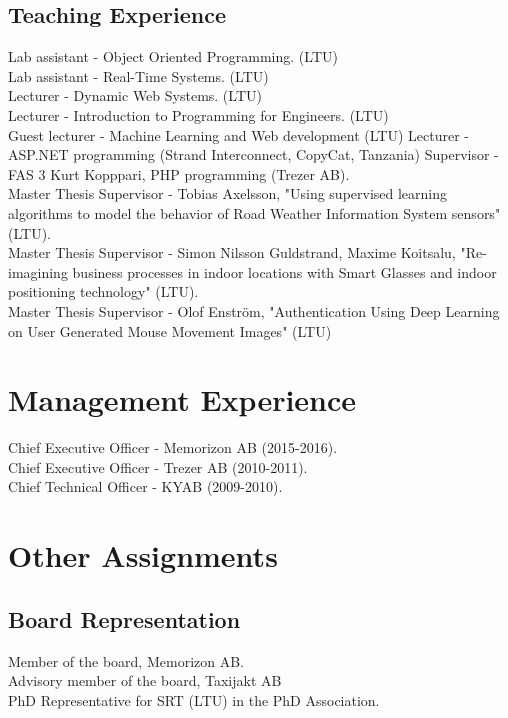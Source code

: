 \documentclass{article}
\begin{document}
\subsection{Teaching Experience}
Lab assistant - Object Oriented Programming. (LTU) \\
Lab assistant - Real-Time Systems. (LTU) \\
\newline
Lecturer - Dynamic Web Systems. (LTU) \\
Lecturer - Introduction to Programming for Engineers. (LTU) \\
Guest lecturer - Machine Learning and Web development (LTU)
Lecturer - ASP.NET programming (Strand Interconnect, CopyCat, Tanzania)
\newline
\newline
Supervisor - FAS 3 Kurt Kopppari, PHP programming (Trezer AB).\\
Master Thesis Supervisor - Tobias Axelsson, "Using supervised learning algorithms to model the behavior of Road Weather Information System sensors" (LTU). \\
\newline
Master Thesis Supervisor - Simon Nilsson Guldstrand, Maxime Koitsalu, "Re-imagining business processes in indoor locations with Smart Glasses and indoor positioning technology" (LTU). \\
Master Thesis Supervisor - Olof Enström, "Authentication Using Deep Learning on
User Generated Mouse Movement Images" (LTU)

\section{Management Experience}
Chief Executive Officer - Memorizon AB (2015-2016).\\
Chief Executive Officer - Trezer AB (2010-2011).\\
Chief Technical Officer - KYAB (2009-2010).

\section{Other Assignments}
\subsection{Board Representation}
Member of the board, Memorizon AB. \\
Advisory member of the board, Taxijakt AB\\
PhD Representative for SRT (LTU) in the PhD Association.
\end{document}
